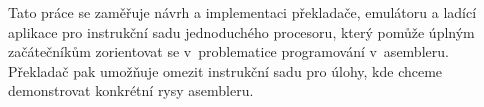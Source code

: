 Tato práce se zaměřuje návrh a implementaci překladače, emulátoru a ladící aplikace pro instrukční sadu jednoduchého procesoru, který pomůže úplným začátečníkům zorientovat se v~problematice programování v~asembleru. Pře\-kla\-dač pak umožňuje omezit instrukční sadu pro úlohy, kde chceme demonstrovat konkrétní rysy asembleru.